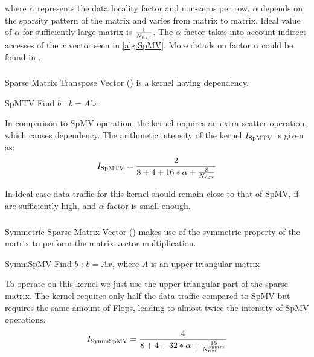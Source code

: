 where $\alpha$ represents the data locality factor and \NNZR non-zeros per row. $\alpha$ depends on the sparsity pattern of the matrix and varies from matrix to matrix. Ideal value of $\alpha$ for sufficiently large matrix is $\frac{1}{N_{nzr}}$. The $\alpha$ factor takes into account indirect accesses of the $x$ vector seen in \cref{alg:SpMV}. More details on factor $\alpha$ could be found in \cite{Moritz_sell}.

\subsubsection{\SpMTV}
Sparse Matrix Transpose Vector (\SpMTV) is a kernel having \DTWO dependency.
\begin{algorithm}[H]
	\caption{SpMTV Find $b$ : $b=A'x$} 
	\label{alg:SpMTV}
	\begin{algorithmic}[1]
		\ENDFOR
		\ENDFOR
	\end{algorithmic}
\end{algorithm}
In comparison to SpMV operation, the kernel requires an extra scatter operation, which causes dependency. The arithmetic intensity of the kernel $I_\mathrm{SpMTV}$ is given as:
\begin{equation}
\label{eq:SpMTV_intensity}
I_\mathrm{\SpMTV} = \frac{2}{8+4+16*\alpha+\frac{8}{\NNZRmath}} \\
\end{equation}

In ideal case data traffic for this kernel should remain close to that of SpMV, if \NNZR are sufficiently high, and $\alpha$ factor is small enough.

\subsubsection{\SymmSpmv}
Symmetric Sparse Matrix Vector (\SymmSpmv) makes use of the symmetric property of the matrix to perform the matrix  vector multiplication.
\begin{algorithm}[H]
	\caption{SymmSpMV Find $b$ : $b=Ax$, where $A$ is an upper triangular matrix} 
	\label{alg:SymmSpMV}
	\begin{algorithmic}[1]
		\ENDFOR
		\ENDFOR
	\end{algorithmic}
\end{algorithm}
To operate on this kernel we just use the upper triangular part of the sparse matrix. The kernel requires only half the data traffic compared to SpMV but requires the same amount of Flops, leading to almost twice the intensity of SpMV operations.
\begin{equation}
\label{eq:SymmSpMV_intensity}
I_\mathrm{\SymmSpmv} = \frac{4}{8+4+32*\alpha+\frac{16}{\NNZRmathSYMM}} \\
\end{equation}

